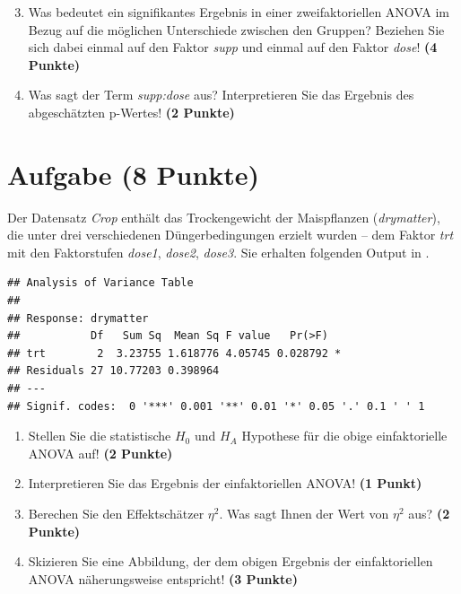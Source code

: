 \documentclass[a4paper, 10pt]{scrartcl}\usepackage[]{graphicx}\usepackage[]{xcolor}
\makeatletter
\newenvironment{kframe}{%
 \def\at@end@of@kframe{}%
 \ifinner\ifhmode%
  \def\at@end@of@kframe{\end{minipage}}%
  \begin{minipage}{\columnwidth}%
 \fi\fi%
 \def\FrameCommand##1{\hskip\@totalleftmargin \hskip-\fboxsep
 \colorbox{shadecolor}{##1}\hskip-\fboxsep
     \hskip-\linewidth \hskip-\@totalleftmargin \hskip\columnwidth}%
 \MakeFramed {\advance\hsize-\width
   \@totalleftmargin\z@ \linewidth\hsize
   \@setminipage}}%
 {\par\unskip\endMakeFramed%
 \at@end@of@kframe}
\newenvironment{knitrout}{}{} %
\makeatother
\begin{document}
\vspace{1Ex}

\begin{enumerate}
  \setcounter{enumi}{2}
\item Was bedeutet ein signifikantes Ergebnis in einer zweifaktoriellen
  ANOVA im Bezug auf die m{\"o}glichen Unterschiede zwischen den Gruppen?
  Beziehen Sie sich dabei einmal auf den Faktor \textit{supp} und einmal
  auf den Faktor \textit{dose}! \textbf{(4 Punkte)}
\item Was sagt der Term \textit{supp:dose} aus? Interpretieren Sie das
  Ergebnis des abgesch{\"a}tzten p-Wertes! \textbf{(2 Punkte)}
\end{enumerate}
 
\clearpage

\section{Aufgabe \hfill (8 Punkte)}


Der Datensatz \textit{Crop} enth{\"a}lt das Trockengewicht der
Maispflanzen (\textit{drymatter}), die unter drei 
verschiedenen D{\"u}ngerbedingungen erzielt wurden -- dem Faktor
\textit{trt} mit den Faktorstufen \textit{dose1}, \textit{dose2},
\textit{dose3}. Sie erhalten folgenden Output in \Rlogo.

\begin{knitrout}
\color{fgcolor}\begin{kframe}
\begin{verbatim}
## Analysis of Variance Table
## 
## Response: drymatter
##           Df   Sum Sq  Mean Sq F value   Pr(>F)  
## trt        2  3.23755 1.618776 4.05745 0.028792 *
## Residuals 27 10.77203 0.398964                   
## ---
## Signif. codes:  0 '***' 0.001 '**' 0.01 '*' 0.05 '.' 0.1 ' ' 1
\end{verbatim}
\end{kframe}
\end{knitrout}

\begin{enumerate}
\item Stellen Sie die statistische $H_0$ und $H_A$ Hypothese f{\"u}r die obige
  einfaktorielle ANOVA auf! \textbf{(2 Punkte)}
\item Interpretieren Sie das Ergebnis der einfaktoriellen ANOVA! \textbf{(1 Punkt)} 
\item Berechen Sie den Effektsch{\"a}tzer $\eta^2$. Was sagt Ihnen der Wert von
  $\eta^2$ aus? \textbf{(2 Punkte)}
\item Skizieren Sie eine Abbildung, der dem obigen Ergebnis der
  einfaktoriellen ANOVA n{\"a}herungsweise entspricht! \textbf{(3 Punkte)}
\end{enumerate}
\end{document}
